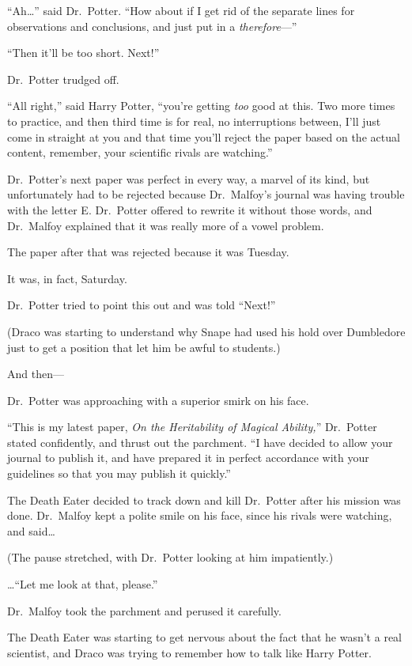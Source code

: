 ``Ah\ldots{}'' said Dr.~Potter. ``How about if I get rid of the separate
lines for observations and conclusions, and just put in a
\emph{therefore}---''

``Then it'll be too short. Next!''

Dr.~Potter trudged off.

``All right,'' said Harry Potter, ``you're getting \emph{too} good at
this. Two more times to practice, and then third time is for real, no
interruptions between, I'll just come in straight at you and that time
you'll reject the paper based on the actual content, remember, your
scientific rivals are watching.''

Dr.~Potter's next paper was perfect in every way, a marvel of its kind,
but unfortunately had to be rejected because Dr.~Malfoy's journal was
having trouble with the letter E. Dr.~Potter offered to rewrite it
without those words, and Dr.~Malfoy explained that it was really more of
a vowel problem.

The paper after that was rejected because it was Tuesday.

It was, in fact, Saturday.

Dr.~Potter tried to point this out and was told ``Next!''

(Draco was starting to understand why Snape had used his hold over
Dumbledore just to get a position that let him be awful to students.)

And then---

Dr.~Potter was approaching with a superior smirk on his face.

``This is my latest paper, \emph{On the Heritability of Magical
Ability,}'' Dr.~Potter stated confidently, and thrust out the parchment.
``I have decided to allow your journal to publish it, and have prepared
it in perfect accordance with your guidelines so that you may publish it
quickly.''

The Death Eater decided to track down and kill Dr.~Potter after his
mission was done. Dr.~Malfoy kept a polite smile on his face, since his
rivals were watching, and said\ldots{}

(The pause stretched, with Dr.~Potter looking at him impatiently.)

\ldots{}``Let me look at that, please.''

Dr.~Malfoy took the parchment and perused it carefully.

The Death Eater was starting to get nervous about the fact that he
wasn't a real scientist, and Draco was trying to remember how to talk
like Harry Potter.


